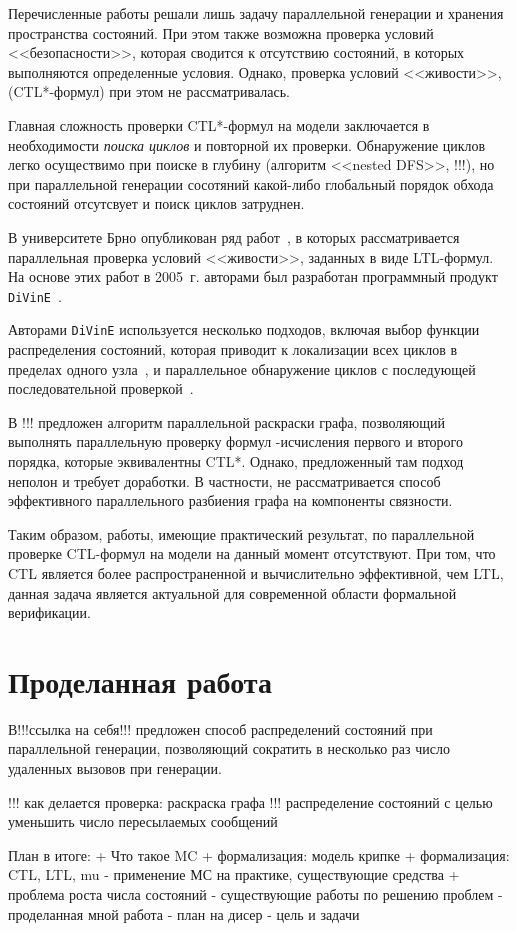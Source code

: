 \documentclass[a4paper,notitlepage,14pt]{article}
\begin{document}
Перечисленные работы решали лишь задачу параллельной генерации и хранения пространства
состояний. При этом также возможна проверка условий <<безопасности>>, которая сводится к
отсутствию состояний, в которых выполняются определенные условия. Однако, проверка условий
<<живости>>, (CTL*-формул) при этом не рассматривалась.

Главная сложность проверки CTL*-формул на модели заключается в необходимости \emph{поиска
  циклов} и повторной их проверки. Обнаружение циклов легко осуществимо при поиске в
глубину (алгоритм <<nested DFS>>, !!!), но при параллельной генерации сосотяний какой-либо
глобальный порядок обхода состояний отсутсвует и поиск циклов затруднен.

В университете Брно опубликован ряд работ~\cite{DLTL1,DLTL2}, в которых рассматривается
параллельная проверка условий <<живости>>, заданных в виде LTL-формул. На основе этих
работ в 2005~г. авторами был разработан программный продукт \texttt{DiVinE}~\cite{DiVinE}.

Авторами \texttt{DiVinE} используется несколько подходов, включая выбор функции
распределения состояний, которая приводит к локализации всех циклов в пределах одного
узла~\cite{DLTL1}, и параллельное обнаружение циклов с последующей последовательной
проверкой~\cite{DLTL2}.

В !!! предложен алгоритм параллельной раскраски графа, позволяющий выполнять параллельную
проверку формул \mu-исчисления первого и второго порядка, которые эквивалентны
CTL*. Однако, предложенный там подход неполон и требует доработки. В частности, не
рассматривается способ эффективного параллельного разбиения графа на компоненты связности.

Таким образом, работы, имеющие практический результат, по параллельной проверке CTL-формул
на модели на данный момент отсутствуют. При том, что CTL является более распространенной и
вычислительно эффективной, чем LTL, данная задача является актуальной для современной
области формальной верификации.

\section{Проделанная работа}
\label{sec:my-work}

В!!!ссылка на себя!!! предложен способ распределений состояний при параллельной генерации,
позволяющий сократить в несколько раз число удаленных вызовов при генерации.

!!! как делается проверка: раскраска графа
!!! распределение состояний с целью уменьшить число пересылаемых сообщений

План в итоге:
+ Что такое MC
+ формализация: модель крипке
+ формализация: CTL, LTL, mu
- применение МС на практике, существующие средства
+ проблема роста числа состояний
- существующие работы по решению проблем
- проделанная мной работа
- план на дисер
- цель и задачи



\end{document}
